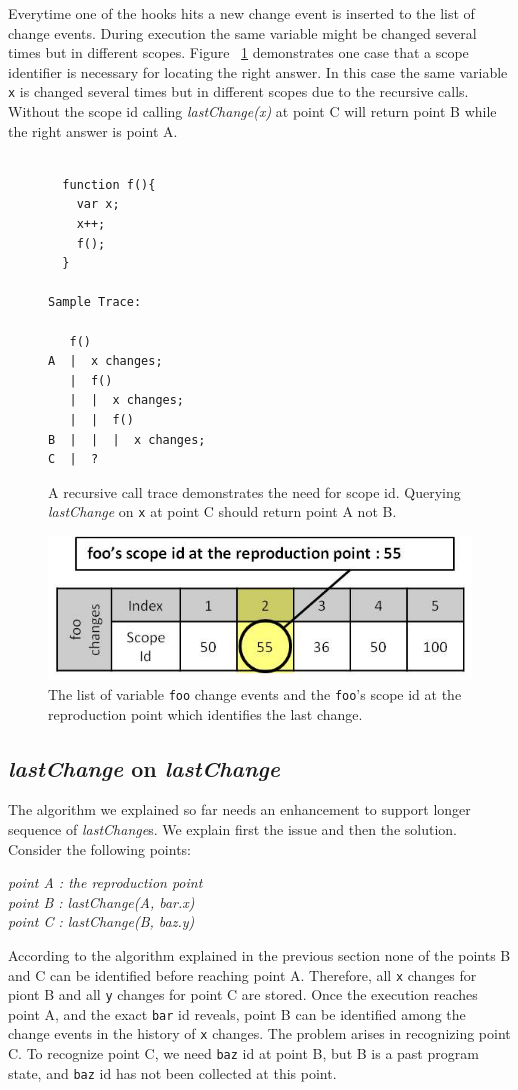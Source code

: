 \documentclass[preprint]{sigplanconf}
\begin{document}
Everytime one of the hooks hits a new change event is inserted to the list of change events. During execution the same variable might be changed several times but in different scopes. Figure ~\ref{fig:recursive} demonstrates one case that a scope identifier is necessary for locating the right answer. In this case the same variable \texttt{x} is changed several times but in different scopes due to the recursive calls. Without the scope id calling \textit{lastChange(x)} at point C will return point B while the right answer is point A.

\begin{figure}[htp]
\begin{verbatim}

  function f(){
    var x;
    x++;
    f();
  }

Sample Trace:

   f()
A  |  x changes; 
   |  f()
   |  |  x changes;
   |  |  f()
B  |  |  |  x changes; 
C  |  ?

\end{verbatim}
\caption{A recursive call trace demonstrates the need for scope id. Querying \textit{lastChange} on \texttt{x} at point C should return point A not B.}
\label{fig:recursive}
\end{figure}

\begin{figure}[htp]
\includegraphics[width=.48\textwidth]{7-foo-changes2.jpg}
\caption{The list of variable \texttt{foo} change events and the \texttt{foo}'s scope id at the reproduction point which identifies the last change.}
\label{fig:foo-changes2}
\end{figure}

 
\subsection{\textit{lastChange} on \textit{lastChange}}
The algorithm we explained so far needs an enhancement to support longer sequence of \textit{lastChange}s. We explain first the issue and then the solution. Consider the following points:

\begin{center}
\textit{
 point A : the reproduction point \\
 point B : lastChange(A, bar.x) \\
 point C : lastChange(B, baz.y) 
 }
 \end{center}
According to the algorithm explained in the previous section none of the points B and C can be identified before reaching point A. Therefore, all \texttt{x} changes for piont B and all \texttt{y} changes for point C are stored. Once the execution reaches point A, and the exact \texttt{bar} id reveals, point B can be identified among the change events in the history of \texttt{x} changes. The problem arises in recognizing point C. To recognize point C, we need \texttt{baz} id at point B, but B is a past program state, and \texttt{baz} id has not been collected at this point. 
\end{document}
